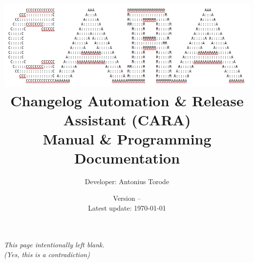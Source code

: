 \documentclass[openany,a4paper,10pt]{book}
\title{\vspace{0.1cm}  \includegraphics[scale=0.6]{./images/cara_cover.png} \vspace{.5cm} \\ Changelog Automation \& Release Assistant (CARA) \\  Manual \& Programming Documentation}
\author{Developer: Antonius Torode}
\date{Version -- \version \\ Latest update: \today}
\begin{document}
\frontmatter
\maketitle

\tableofcontents
\newpage
\vspace*{\fill}
\begin{center}
	\textit{This page intentionally left blank. \\(Yes, this is a contradiction)}
\end{center}
\vspace*{\fill}

\mainmatter
\pagestyle{fancy}
\fancyhf{}
\fancyhead[RO, LE]{\thepage}







\backmatter
%
%
\printindex
\end{document}

